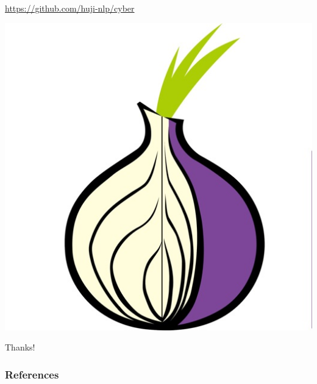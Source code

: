 \documentclass[t,xcolor={svgnames,table},aspectratio=169]{beamer}
\begin{document}
\begin{frame}
	\begin{minipage}{.7\textwidth}
	\color{blue}\url{https://github.com/huji-nlp/cyber}
	\end{minipage}
	\pause
	\hfill
	\begin{minipage}{.28\textwidth}
	\centering\vspace{-2cm}
	\includegraphics[width=.6\textwidth]{onion.jpg}
	
	Thanks!
	\end{minipage}
\end{frame}

\begin{frame}[allowframebreaks]
\frametitle{References}

\tiny
\end{frame}
\end{document}
